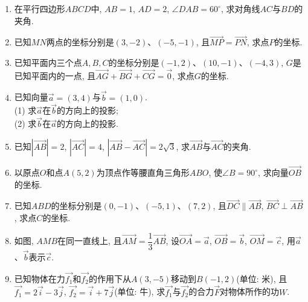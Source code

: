\documentclass[10pt,a4paper]{article}
\begin{document}
\begin{enumerate}[1.]
\begin{center}
\end{center}
\item 在平行四边形$ABCD$中, $AB=1$, $AD=2$, $\angle DAB=60^{\circ }$, 求对角线$AC$与$BD$的夹角.
\item 已知$MN$两点的坐标分别是$(3,-2)$、$(-5,-1)$, 且$\overrightarrow{MP}=\overrightarrow{PN}$, 求点$P$的坐标.
\item 已知平面内三个点$A,B,C$的坐标分别是$(-1,2)$、$(10,-1)$、$(-4,3)$, $G$是已知平面内的一点, 且$\overrightarrow{AG}+\overrightarrow{BG}+\overrightarrow{CG}=\overrightarrow 0$, 求点$G$的坐标.
\item 已知向量$\overrightarrow a=(3,4)$与$\overrightarrow b=(1,0)$.\\
(1) 求$\overrightarrow a$在$\overrightarrow b$的方向上的投影;\\
(2) 求$\overrightarrow b$在$\overrightarrow a$的方向上的投影.
\item 已知$|\overrightarrow{AB}|=2$, $|\overrightarrow{AC}|=4$, $|\overrightarrow{AB}-\overrightarrow{AC}|=2\sqrt 3$, 求$\overrightarrow{AB}$与$\overrightarrow{AC}$的夹角.
\item 以原点$O$和点$A(5,2)$为顶点作等腰直角三角形$ABO$, 使$\angle B=90^{\circ }$, 求向量$\overrightarrow{OB}$的坐标.
\item 已知$ABD$的坐标分别是$(0,-1)$、$(-5,1)$、$(7,2)$, 且$\overrightarrow{DC}\parallel \overrightarrow{AB}$, $\overrightarrow{BC}\perp \overrightarrow{AB}$, 求点$C$的坐标.
\item 如图, $AMB$在同一直线上, 且$\overrightarrow{AM}=\dfrac 13\overrightarrow{AB}$, 设$\overrightarrow{OA}=\overrightarrow a$, $\overrightarrow{OB}=\overrightarrow b$, $\overrightarrow{OM}=\overrightarrow c$, 用$\overrightarrow a$、$\overrightarrow b$表示$\overrightarrow c$.
\begin{center}
\end{center}
\item 已知物体在力$\overrightarrow{f_1}$和$\overrightarrow{f_2}$的作用下从$A(3,-5)$移动到$B(-1,2)$(单位: 米), 且$\overrightarrow{f_1}=2\overrightarrow i-3\overrightarrow j$, $\overrightarrow{f_2}=\overrightarrow i+7\overrightarrow j$(单位: 牛), 求$\overrightarrow{f_1}$与$\overrightarrow{f_2}$的合力$\overrightarrow F$对物体所作的功$W$.

\end{enumerate}
\end{document}
